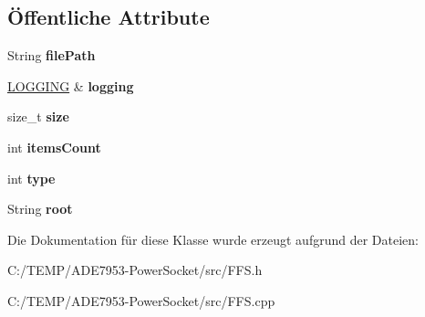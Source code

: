 \subsection*{Öffentliche Attribute}
\begin{DoxyCompactItemize}
\item 
\mbox{\label{class_f_f_sjson_file_aa15032daa3d7179403433f72e1e1a657}} 
String {\bfseries file\+Path}
\item 
\mbox{\label{class_f_f_sjson_file_a63bbb2a22adc5b918b48f6098d903b3f}} 
\hyperlink{class_l_o_g_g_i_n_g}{L\+O\+G\+G\+I\+NG} \& {\bfseries logging}
\item 
\mbox{\label{class_f_f_sjson_file_a4d0825acc72064f5ec0319141d41d16c}} 
size\+\_\+t {\bfseries size}
\item 
\mbox{\label{class_f_f_sjson_file_ac5f1818d70092331ece9c6601bed3e32}} 
int {\bfseries items\+Count}
\item 
\mbox{\label{class_f_f_sjson_file_ae56ea669e23c33baf323decf44de3a68}} 
int {\bfseries type}
\item 
\mbox{\label{class_f_f_sjson_file_a9d474a402bf84b215c5203aa3152af62}} 
String {\bfseries root}
\end{DoxyCompactItemize}


Die Dokumentation für diese Klasse wurde erzeugt aufgrund der Dateien\+:\begin{DoxyCompactItemize}
\item 
C\+:/\+T\+E\+M\+P/\+A\+D\+E7953-\/\+Power\+Socket/src/F\+F\+S.\+h\item 
C\+:/\+T\+E\+M\+P/\+A\+D\+E7953-\/\+Power\+Socket/src/F\+F\+S.\+cpp\end{DoxyCompactItemize}
